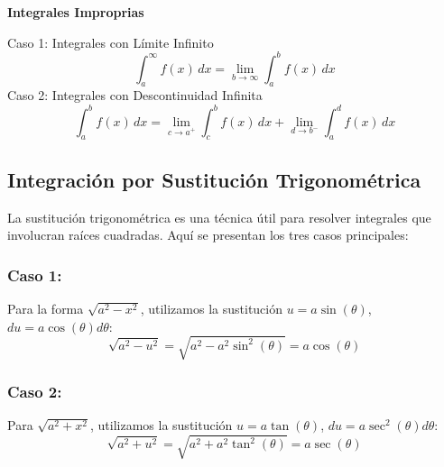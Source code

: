\textbf{Integrales Improprias}

Caso 1: Integrales con Límite Infinito
\begin{equation*}
    \int_a^\infty f(x) \, dx = \lim_{b \to \infty} \int_a^b f(x) \, dx
\end{equation*}
Caso 2: Integrales con Descontinuidad Infinita
\begin{equation*}
    \int_a^b f(x) \, dx = \lim_{c \to a^+} \int_c^b f(x) \, dx + \lim_{d \to b^-} \int_a^d f(x) \, dx
\end{equation*}
\newpage

\subsection{Integración por Sustitución Trigonométrica}

La sustitución trigonométrica es una técnica útil para resolver integrales que involucran raíces cuadradas. Aquí se presentan los tres casos principales:

\subsubsection{Caso 1:}

Para la forma \(\sqrt{a^2 - x^2}\), utilizamos la sustitución \( u= a \sin(\theta)\), \(du = a \cos(\theta) d\theta\):
\begin{equation}
    \sqrt{a^2 - u^2} = \sqrt{a^2 - a^2 \sin^2(\theta)} = a \cos(\theta)
\end{equation}

\begin{center}
\end{center}

\subsubsection{Caso 2:}

Para \(\sqrt{a^2 + x^2}\), utilizamos la sustitución \(u= a \tan(\theta)\), \(du = a \sec^2(\theta) d\theta\):
\begin{equation}
    \sqrt{a^2 + u^2} = \sqrt{a^2 + a^2 \tan^2(\theta)} = a \sec(\theta)
\end{equation}


